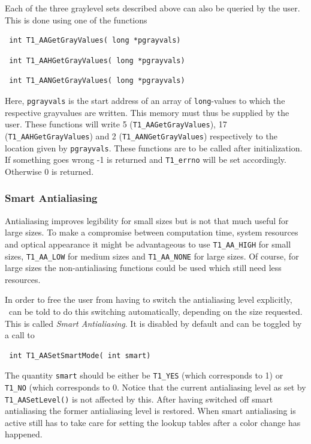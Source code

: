Each of the three graylevel sets described above can also be queried by the
user. This is done using one of the functions
\precorr
\begin{verbatim}
 int T1_AAGetGrayValues( long *pgrayvals)
\end{verbatim}\postcorr
\precorr
\begin{verbatim}
 int T1_AAHGetGrayValues( long *pgrayvals)
\end{verbatim}\postcorr
\precorr
\begin{verbatim}
 int T1_AANGetGrayValues( long *pgrayvals)
\end{verbatim}\postcorr
Here, \verb+pgrayvals+ is the start address of an array of \verb+long+-values
to which the respective grayvalues are written. This memory must thus be
supplied by the user. These functions will write 5
(\verb+T1_AAGetGrayValues+), 17 (\verb+T1_AAHGetGrayValues+) and 2
(\verb+T1_AANGetGrayValues+) respectively to the location given by
\verb+pgrayvals+. These functions are to be called after initialization. If
something goes wrong -1 is returned and \verb+T1_errno+ will be set
accordingly. Otherwise 0 is returned. 


\subsubsection{Smart Antialiasing} 
\label{smartantialiasing}%
Antialiasing improves legibility for small sizes but is not that much useful
for large sizes. To make a compromise between computation time, system
resources and optical appearance it might be advantageous to use
\verb+T1_AA_HIGH+ for small sizes, \verb+T1_AA_LOW+ for medium sizes and
\verb+T1_AA_NONE+ for large sizes. Of course, for large sizes the
non-antialiasing functions could be used which still need less resources. 

In order to free the user from having to switch the antialiasing level explicitly,
\tonelib\ can be told to do this switching
automatically, depending on the size requested. This is called {\em Smart
  Antialiasing}. It is disabled by default and can be toggled by a call to 
\precorr
\begin{verbatim}
 int T1_AASetSmartMode( int smart)
\end{verbatim}\postcorr
The quantity \verb+smart+ should be either be \verb+T1_YES+ (which corresponds
to 1) or \verb+T1_NO+ (which corresponds to 0. Notice that the current
antialiasing level as set by \verb+T1_AASetLevel()+ is not affected by
this. After having switched off smart antialiasing the former antialiasing
level is restored. When smart antialiasing is active still has to take care
for setting the lookup tables after a color change has happened.

